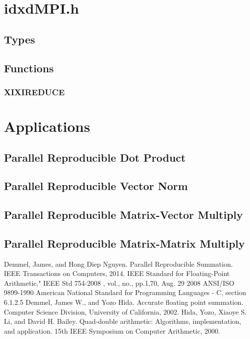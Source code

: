 \documentclass[12pt]{article}
\theoremstyle{plain}
\begin{document}
\section{idxdMPI.h}
  \subsection{Types}
  \subsection{Functions}
    \subsubsection{XIXIREDUCE}
\section{Applications}
  \subsection{Parallel Reproducible Dot Product}
  \subsection{Parallel Reproducible Vector Norm}
  \subsection{Parallel Reproducible Matrix-Vector Multiply}
  \subsection{Parallel Reproducible Matrix-Matrix Multiply}
\begin{thebibliography}{9}
    Demmel, James, and Hong Diep Nguyen. Parallel Reproducible Summation. IEEE Transactions on Computers, 2014.
    IEEE Standard for Floating-Point Arithmetic," IEEE Std 754-2008 , vol., no., pp.1,70, Aug. 29 2008
    ANSI/ISO 9899-1990 American National Standard for Programming Languages - C, section 6.1.2.5
    Demmel, James W., and Yozo Hida. Accurate floating point summation. Computer Science Division, University of California, 2002.
    Hida, Yozo, Xiaoye S. Li, and David H. Bailey. Quad-double arithmetic: Algorithms, implementation, and application. 15th IEEE Symposium on Computer Arithmetic, 2000.
\end{thebibliography}
\end{document}
